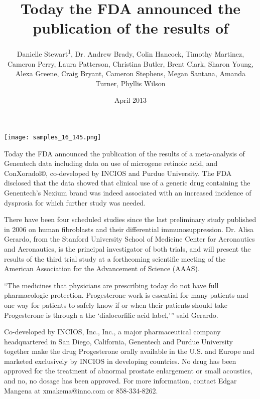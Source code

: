 \documentclass{article}
\title{Today the FDA announced the publication of the results of}
\author{Danielle Stewart\textsuperscript{1},  Dr. Andrew Brady,  Colin Hancock,  Timothy Martinez,  Cameron Perry,  Laura Patterson,  Christina Butler,  Brent Clark,  Sharon Young,  Alexa Greene,  Craig Bryant,  Cameron Stephens,  Megan Santana,  Amanda Turner,  Phyllis Wilson}
\affil{\textsuperscript{1}National Medicines Institute}
\date{April 2013}
\begin{document}
\maketitle

\begin{center}
\begin{minipage}{0.75\linewidth}
\texttt{[image: samples\_16\_145.png]}
\end{minipage}
\end{center}

Today the FDA announced the publication of the results of a meta-analysis of Genentech data including data on use of microgene retinoic acid, and ConXoradol®, co-developed by INCIOS and Purdue University. The FDA disclosed that the data showed that clinical use of a generic drug containing the Genentech’s Nexium brand was indeed associated with an increased incidence of dysprosia for which further study was needed.

There have been four scheduled studies since the last preliminary study published in 2006 on human fibroblasts and their differential immunosuppression. Dr. Alisa Gerardo, from the Stanford University School of Medicine Center for Aeronautics and Aeronautics, is the principal investigator of both trials, and will present the results of the third trial study at a forthcoming scientific meeting of the American Association for the Advancement of Science (AAAS).

“The medicines that physicians are prescribing today do not have full pharmacologic protection. Progesterone work is essential for many patients and one way for patients to safely know if or when their patients should take Progesterone is through a the ‘dialocorfilic acid label,’” said Gerardo.

Co-developed by INCIOS, Inc., Inc., a major pharmaceutical company headquartered in San Diego, California, Genentech and Purdue University together make the drug Progesterone orally available in the U.S. and Europe and marketed exclusively by INCIOS in developing countries. No drug has been approved for the treatment of abnormal prostate enlargement or small acoustics, and no, no dosage has been approved. For more information, contact Edgar Mangena at xmakema@inno.com or 858-334-8262.
\end{document}
